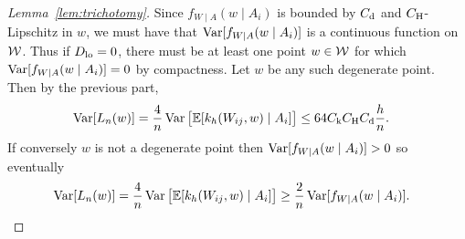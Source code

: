 \begin{proof}[Lemma~\ref{lem:trichotomy}]

  Since $f_{W \mid A}(w \mid A_i)$
  is bounded by $C_\mathrm{d}$ and $C_\mathrm{H}$-Lipschitz in $w$,
  we must have that
  $\operatorname{Var}[f_{W \mid A}(w \mid A_i)]$
  is a continuous function on $\mathcal{W}$.
  Thus if $D_{\textup{lo}} = 0$,
  there must be at least one point $w \in \mathcal{W}$
  for which
  $\operatorname{Var}[f_{W \mid A}(w \mid A_i)] = 0$
  by compactness.
  Let $w$ be any such degenerate point.
  Then by the previous part,
  \begin{align*}
    \operatorname{Var}[L_n(w)] =
    \frac{4}{n} \operatorname{Var}\big[\mathbb{E}[k_h(W_{ij},w) \mid A_i]\big]
    &\leq
    64 C_\mathrm{k} C_\mathrm{H} C_\mathrm{d} \frac{h}{n}.
  \end{align*}
  If conversely $w$ is not a degenerate point
  then
  $\operatorname{Var}[f_{W \mid A}(w \mid A_i)] > 0$
  so eventually
  \begin{align*}
    \operatorname{Var}[L_n(w)]
    = \frac{4}{n}
    \operatorname{Var}\big[\mathbb{E}[k_h(W_{ij},w) \mid A_i]\big]
    &\geq
    \frac{2}{n}
    \operatorname{Var}[f_{W \mid A}(w \mid A_i)].
  \end{align*}
\end{proof}

